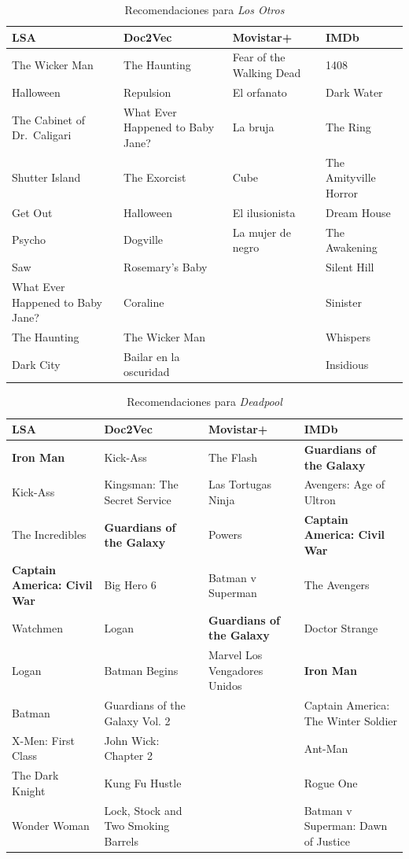 \documentclass[withindex, glossary]{cam-thesis}
\begin{document}
\begin{table}
    \begin{tabularx}{\textwidth}{XXXX}
        \toprule
        \hiderowcolors{}LSA & Doc2Vec & Movistar+ & IMDb\\
        \midrule
        \showrowcolors{}The Wicker Man & The Haunting & Fear of the Walking Dead & 1408\\
        Halloween & Repulsion & El orfanato & Dark Water\\
        The Cabinet of Dr.\ Caligari & What Ever Happened to Baby Jane? & La bruja & The Ring\\
        Shutter Island & The Exorcist & Cube & The Amityville Horror\\
        Get Out & Halloween & El ilusionista & Dream House\\
        Psycho & Dogville & La mujer de negro & The Awakening\\
        Saw & Rosemary's Baby & & Silent Hill\\
        What Ever Happened to Baby Jane? & Coraline & & Sinister\\
        The Haunting & The Wicker Man & & Whispers\\
        Dark City & Bailar en la oscuridad & & Insidious\\
        \bottomrule
    \end{tabularx}
    \caption{Recomendaciones para \textit{Los Otros}}
\end{table}

\begin{table}
    \begin{tabularx}{\textwidth}{XXXX}
        \toprule
        \hiderowcolors{}LSA & Doc2Vec & Movistar+ & IMDb\\
        \midrule
        \showrowcolors{}\textbf{Iron Man} & Kick-Ass & The Flash & \textbf{Guardians of the Galaxy}\\
        Kick-Ass & Kingsman: The Secret Service & Las Tortugas Ninja & Avengers: Age of Ultron\\
        The Incredibles & \textbf{Guardians of the Galaxy} & Powers & \textbf{Captain America: Civil War}\\
        \textbf{Captain America: Civil War} & Big Hero 6 & Batman v Superman & The Avengers\\
        Watchmen & Logan & \textbf{Guardians of the Galaxy} & Doctor Strange\\
        Logan & Batman Begins & Marvel Los Vengadores Unidos & \textbf{Iron Man}\\
        Batman & Guardians of the Galaxy Vol. 2 & & Captain America: The Winter Soldier\\
        X-Men: First Class & John Wick: Chapter 2 & & Ant-Man\\
        The Dark Knight & Kung Fu Hustle & & Rogue One\\
        Wonder Woman & Lock, Stock and Two Smoking Barrels & & Batman v Superman: Dawn of Justice\\
        \bottomrule
    \end{tabularx}
    \caption{Recomendaciones para \textit{Deadpool}}
\end{table}
\end{document}
